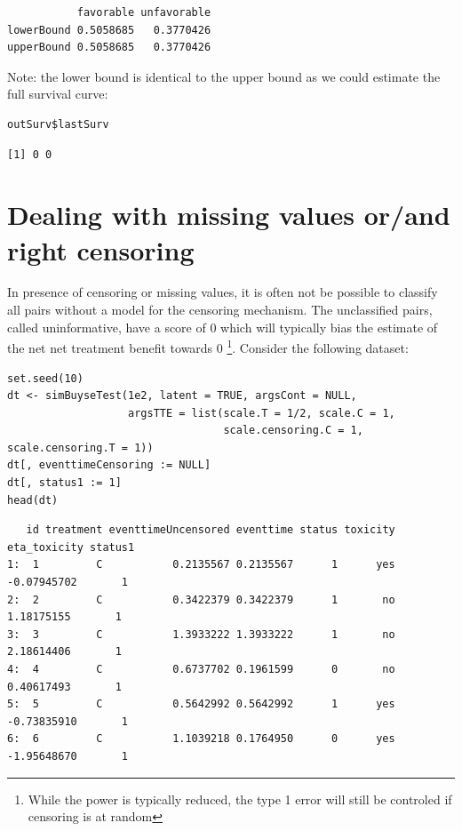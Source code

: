 \documentclass[12pt]{article}
\begin{document}
\begin{verbatim}
           favorable unfavorable
lowerBound 0.5058685   0.3770426
upperBound 0.5058685   0.3770426
\end{verbatim}


Note: the lower bound is identical to the upper bound as we could
estimate the full survival curve:
\lstset{language=r,label= ,caption= ,captionpos=b,numbers=none}
\begin{lstlisting}
outSurv$lastSurv
\end{lstlisting}

\begin{verbatim}
[1] 0 0
\end{verbatim}


\clearpage

\section{Dealing with missing values or/and right censoring}
\label{sec:org02de1a6}

In presence of censoring or missing values, it is often not be
 possible to classify all pairs without a model for the censoring
 mechanism. The unclassified pairs, called uninformative, have a score
 of 0 which will typically bias the estimate of the net net treatment benefit
 towards 0 \footnote{While the power is typically reduced, the type 1 error
 will still be controled if censoring is at random}. Consider the
 following dataset:
\lstset{language=r,label= ,caption= ,captionpos=b,numbers=none}
\begin{lstlisting}
set.seed(10)
dt <- simBuyseTest(1e2, latent = TRUE, argsCont = NULL,
                   argsTTE = list(scale.T = 1/2, scale.C = 1,
                                  scale.censoring.C = 1, scale.censoring.T = 1))
dt[, eventtimeCensoring := NULL]
dt[, status1 := 1]
head(dt)
\end{lstlisting}

\begin{verbatim}
   id treatment eventtimeUncensored eventtime status toxicity eta_toxicity status1
1:  1         C           0.2135567 0.2135567      1      yes  -0.07945702       1
2:  2         C           0.3422379 0.3422379      1       no   1.18175155       1
3:  3         C           1.3933222 1.3933222      1       no   2.18614406       1
4:  4         C           0.6737702 0.1961599      0       no   0.40617493       1
5:  5         C           0.5642992 0.5642992      1      yes  -0.73835910       1
6:  6         C           1.1039218 0.1764950      0      yes  -1.95648670       1
\end{verbatim}
\end{document}

